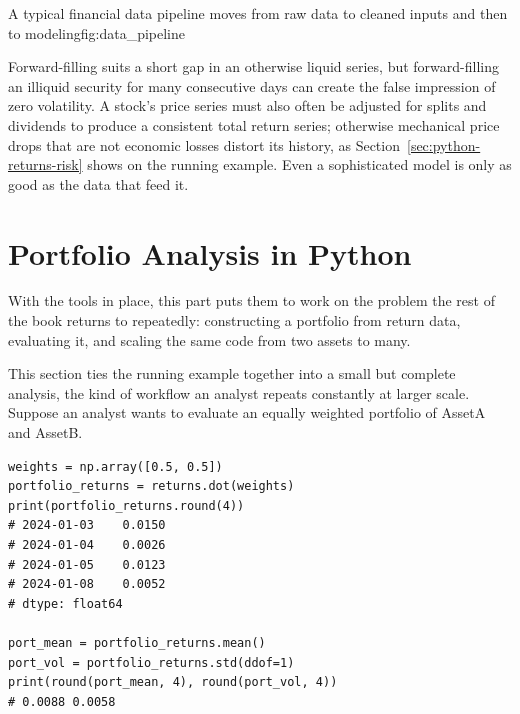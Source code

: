 \documentclass[../ai_in_finance]{subfiles}
\begin{document}
\begin{bookfigure}[htb]{A typical financial data pipeline moves from raw data to cleaned inputs and then to modeling}{fig:data_pipeline}
\end{bookfigure}

Forward-filling suits a short gap in an otherwise liquid series, but forward-filling an illiquid security for many consecutive days can create the false impression of zero volatility. A stock's price series must also often be adjusted for splits and dividends to produce a consistent total return series; otherwise mechanical price drops that are not economic losses distort its history, as Section~\ref{sec:python-returns-risk} shows on the running example. Even a sophisticated model is only as good as the data that feed it.

\section{Portfolio Analysis in Python}

With the tools in place, this part puts them to work on the problem the rest of the book returns to repeatedly: constructing a portfolio from return data, evaluating it, and scaling the same code from two assets to many.

\label{sec:worked-example}

This section ties the running example together into a small but complete analysis, the kind of workflow an analyst repeats constantly at larger scale. Suppose an analyst wants to evaluate an equally weighted portfolio of AssetA and AssetB.

\begin{verbatim}
weights = np.array([0.5, 0.5])
portfolio_returns = returns.dot(weights)
print(portfolio_returns.round(4))
# 2024-01-03    0.0150
# 2024-01-04    0.0026
# 2024-01-05    0.0123
# 2024-01-08    0.0052
# dtype: float64

port_mean = portfolio_returns.mean()
port_vol = portfolio_returns.std(ddof=1)
print(round(port_mean, 4), round(port_vol, 4))
# 0.0088 0.0058
\end{verbatim}
\end{document}
